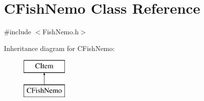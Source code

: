 \hypertarget{class_c_fish_nemo}{}\section{C\+Fish\+Nemo Class Reference}
\label{class_c_fish_nemo}


{\ttfamily \#include $<$Fish\+Nemo.\+h$>$}

Inheritance diagram for C\+Fish\+Nemo\+:\begin{figure}[H]
\begin{center}
\leavevmode
\includegraphics[height=2.000000cm]{class_c_fish_nemo}
\end{center}
\end{figure}
